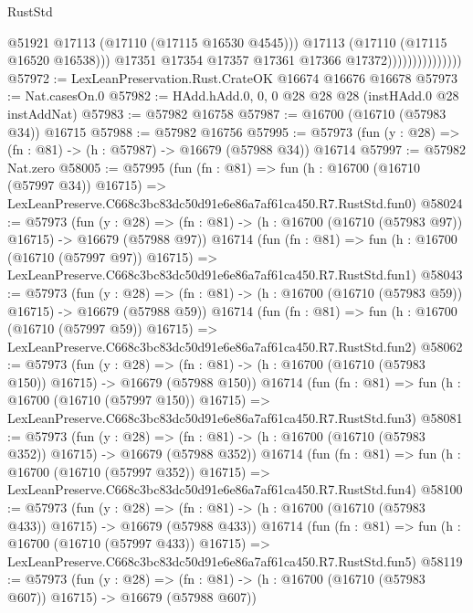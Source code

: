\begin{lexlean}{RustStd}
\begin{coremodule}
                                      @51921
                                      @17113
                                      (@17110 (@17115 @16530 @4545)))
                                    @17113
                                    (@17110 (@17115 @16520 @16538)))
                                  @17351
                                  @17354
                                  @17357
                                  @17361
                                  @17366
                                  @17372)))))))))))))))
@57972 := LexLeanPreservation.Rust.CrateOK @16674 @16676 @16678
@57973 := Nat.casesOn.{0}
@57982 := HAdd.hAdd.{0, 0, 0} @28 @28 @28 (instHAdd.{0} @28 instAddNat)
@57983 := @57982 @16758
@57987 := @16700 (@16710 (@57983 @34)) @16715
@57988 := @57982 @16756
@57995 := @57973 (fun (y : @28) => (fn : @81) -> (h : @57987) -> @16679 (@57988 @34)) @16714
@57997 := @57982 Nat.zero
@58005 := @57995
    (fun (fn : @81) =>
    fun (h : @16700 (@16710 (@57997 @34)) @16715) =>
    LexLeanPreserve.C668c3bc83dc50d91e6e86a7af61ca450.R7.RustStd.fun0)
@58024 := @57973
    (fun (y : @28) =>
    (fn : @81) -> (h : @16700 (@16710 (@57983 @97)) @16715) -> @16679 (@57988 @97))
    @16714
    (fun (fn : @81) =>
    fun (h : @16700 (@16710 (@57997 @97)) @16715) =>
    LexLeanPreserve.C668c3bc83dc50d91e6e86a7af61ca450.R7.RustStd.fun1)
@58043 := @57973
    (fun (y : @28) =>
    (fn : @81) -> (h : @16700 (@16710 (@57983 @59)) @16715) -> @16679 (@57988 @59))
    @16714
    (fun (fn : @81) =>
    fun (h : @16700 (@16710 (@57997 @59)) @16715) =>
    LexLeanPreserve.C668c3bc83dc50d91e6e86a7af61ca450.R7.RustStd.fun2)
@58062 := @57973
    (fun (y : @28) =>
    (fn : @81) -> (h : @16700 (@16710 (@57983 @150)) @16715) -> @16679 (@57988 @150))
    @16714
    (fun (fn : @81) =>
    fun (h : @16700 (@16710 (@57997 @150)) @16715) =>
    LexLeanPreserve.C668c3bc83dc50d91e6e86a7af61ca450.R7.RustStd.fun3)
@58081 := @57973
    (fun (y : @28) =>
    (fn : @81) -> (h : @16700 (@16710 (@57983 @352)) @16715) -> @16679 (@57988 @352))
    @16714
    (fun (fn : @81) =>
    fun (h : @16700 (@16710 (@57997 @352)) @16715) =>
    LexLeanPreserve.C668c3bc83dc50d91e6e86a7af61ca450.R7.RustStd.fun4)
@58100 := @57973
    (fun (y : @28) =>
    (fn : @81) -> (h : @16700 (@16710 (@57983 @433)) @16715) -> @16679 (@57988 @433))
    @16714
    (fun (fn : @81) =>
    fun (h : @16700 (@16710 (@57997 @433)) @16715) =>
    LexLeanPreserve.C668c3bc83dc50d91e6e86a7af61ca450.R7.RustStd.fun5)
@58119 := @57973
    (fun (y : @28) =>
    (fn : @81) -> (h : @16700 (@16710 (@57983 @607)) @16715) -> @16679 (@57988 @607))

\end{coremodule}
\end{lexlean}
